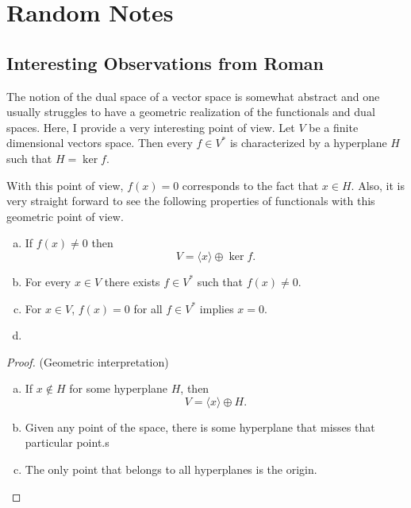 \chapter{Random Notes}

\section{Interesting Observations from Roman}

\begin{observation}
	The notion of the dual space of a vector space is somewhat abstract and one usually struggles to have a geometric realization of the functionals and dual spaces. Here, I provide a very interesting point of view. Let $ V $  be a finite dimensional vectors space. Then every $ f \in V^* $ is characterized by a hyperplane $ H $ such that $ H = \operatorname{ker} f $. 
	
	\noindent With this point of view, $ f(x) = 0 $ corresponds to the fact that $ x \in  H $. Also, it is very straight forward to see the following properties of functionals with this geometric point of view.
	\begin{proposition}
		\begin{enumerate}[(a)]
			\item If $ f(x) \neq 0 $ then 
			\[ V = \langle x \rangle \oplus \ker f. \]
			\item For every $ x\in V $ there exists $ f \in V^* $ such that $ f(x) \neq 0 $.
			\item For $ x\in V $, $ f(x) = 0 $ for all $ f\in V^* $ implies $ x = 0 $.
			\item 
		\end{enumerate}
	\end{proposition}
	\begin{proof}(Geometric interpretation)
		\begin{enumerate}[(a)]
			\item If $ x\notin H $ for some hyperplane $ H $, then 
			\[ V = \langle x \rangle \oplus H. \]
			\item Given any point of the space, there is some hyperplane that misses that particular point.s
			\item The only point that belongs to all hyperplanes is the origin.
		\end{enumerate}
	\end{proof}
\end{observation}


